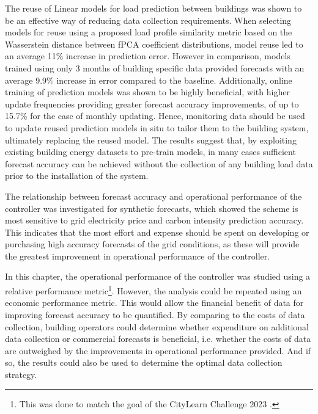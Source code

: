 The reuse of Linear models for load prediction between buildings was shown to be an effective way of reducing data collection requirements. When selecting models for reuse using a proposed load profile similarity metric based on the Wasserstein distance between fPCA coefficient distributions, model reuse led to an average 11\% increase in prediction error. However in comparison, models trained using only 3 months of building specific data provided forecasts with an average 9.9\% increase in error compared to the baseline. Additionally, online training of prediction models was shown to be highly beneficial, with higher update frequencies providing greater forecast accuracy improvements, of up to 15.7\% for the case of monthly updating. Hence, monitoring data should be used to update reused prediction models in situ to tailor them to the building system, ultimately replacing the reused model. The results suggest that, by exploiting existing building energy datasets to pre-train models, in many cases sufficient forecast accuracy can be achieved without the collection of any building load data prior to the installation of the system.

The relationship between forecast accuracy and operational performance of the  controller was investigated for synthetic forecasts, which showed the  scheme is most sensitive to grid electricity price and carbon intensity prediction accuracy. This indicates that the most effort and expense should be spent on developing or purchasing high accuracy forecasts of the grid conditions, as these will provide the greatest improvement in operational performance of the controller.


In this chapter, the operational performance of the  controller was studied using a relative performance metric\footnote{This was done to match the goal of the CityLearn Challenge 2023 \citep{nagy2023CityLearnChallenge2023}.}. However, the analysis could be repeated using an economic performance metric. This would allow the financial benefit of data for improving forecast accuracy to be quantified. By comparing to the costs of data collection, building operators could determine whether expenditure on additional data collection or commercial forecasts is beneficial, i.e. whether the costs of data are outweighed by the improvements in operational performance provided. And if so, the results could also be used to determine the optimal data collection strategy.

